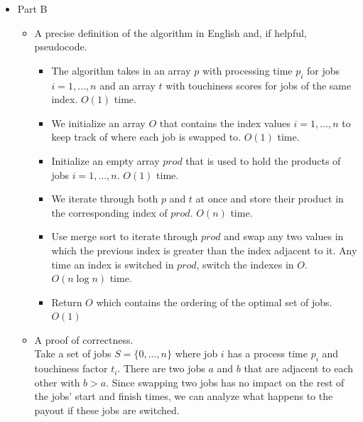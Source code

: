 \documentclass[letterpaper,11pt]{article}
\begin{document}
\begin{enumerate}
\begin{itemize}
  \newpage
  \item Part B
      \begin{itemize}
          \item A precise definition of the algorithm in English and, if helpful, pseudocode.

              \begin{itemize}
                  \item The algorithm takes in an array $p$ with processing time
                      $p_i$ for jobs $i = 1, \ldots, n$ and an array $t$ with 
                      touchiness scores for jobs of the same index. 
                      $O\left( 1 \right) $ time.
                  \item We initialize an array $O$ that contains the index values
                      $i = 1, \ldots, n$ to keep track of where each job is 
                      swapped to. $O\left( 1 \right) $ time.
                  \item Initialize an empty array $prod$ that is used to hold
                      the products of jobs $i = 1, \ldots, n$. $O\left( 1 \right) $
                      time.
                  \item We iterate through both $p$ and $t$ at once and store 
                      their product in the corresponding index of $prod$.
                      $O\left( n \right) $ time.
                  \item Use merge sort to iterate through
                      $prod$ and swap any two values in which the previous 
                      index is greater than the index adjacent to it. Any time 
                      an index is switched in $prod$, switch the indexes in  $O$.
                      $O\left( n\log{n}\right) $ time.
                  \item Return $O$ which contains the ordering of the optimal 
                      set of jobs. $O\left( 1 \right) $
              \end{itemize}

          \item A proof of correctness. \\

              Take a set of jobs $S = \{0, \ldots, n\} $ where job $i$ has a
              process time $p_i$ and touchiness factor $t_i$. There are two jobs
              $a$ and $b$ that are adjacent to each other with $b > a$. Since 
              swapping two jobs has no impact on the rest of the jobs' start 
              and finish times, we can analyze what happens to the payout 
              if these jobs are switched. \\



\end{itemize}
\end{itemize}
\end{enumerate}
\end{document}
